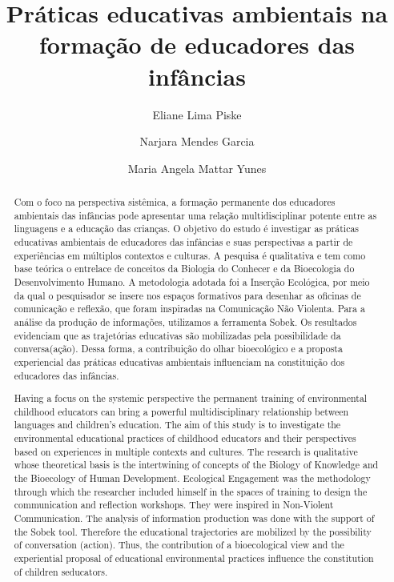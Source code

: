 \documentclass{textolivre}
\title{Práticas educativas ambientais na formação de educadores das infâncias}
\author[1]{Eliane Lima Piske}
\author[2]{Narjara Mendes Garcia}
\author[3]{Maria Angela Mattar Yunes}
\affil[1]{Universidade Federal do Rio Grande, Brasil. Email: \url{e.nanny@hotmail.com} \orcid{0000-0003-0933-4835}}
\affil[2]{Universidade Federal do Rio Grande, Brasil. Email: \url{narjaramg@gmail.com} \orcid{0000-0003-0947-6542}}
\affil[3]{Universidade Salgado de Oliveira, Brasil. Email: \url{mamyunes@gmail.com} \orcid{0000-0002-4653-3895}}
\begin{document}
\maketitle

\begin{poliabstract}
\begin{abstract}
Com o foco na perspectiva sistêmica, a formação permanente dos educadores ambientais das infâncias pode apresentar uma relação multidisciplinar potente entre as linguagens e a educação das crianças. O objetivo do estudo é investigar as práticas educativas ambientais de educadores das infâncias e suas perspectivas a partir de experiências em múltiplos contextos e culturas. A pesquisa é qualitativa e tem como base teórica o entrelace de conceitos da Biologia do Conhecer e da Bioecologia do Desenvolvimento Humano. A metodologia adotada foi a Inserção Ecológica, por meio da qual o pesquisador se insere nos espaços formativos para desenhar as oficinas de comunicação e reflexão, que foram inspiradas na Comunicação Não Violenta. Para a análise da produção de informações, utilizamos a ferramenta Sobek. Os resultados evidenciam que as trajetórias educativas são mobilizadas pela possibilidade da conversa(ação). Dessa forma, a contribuição do olhar bioecológico e a proposta experiencial das práticas educativas ambientais influenciam na constituição dos educadores das infâncias.

\end{abstract}

\begin{english}
\begin{abstract}
Having a focus on the systemic perspective the permanent training of environmental childhood educators can bring a powerful multidisciplinary relationship between languages and children's education. The aim of this study is to investigate the environmental educational practices of childhood educators and their perspectives based on experiences in multiple contexts and cultures. The research is qualitative whose theoretical basis is the intertwining of concepts of the Biology of Knowledge and the Bioecology of Human Development. Ecological Engagement was the methodology through which the researcher included himself in the spaces of training to design the communication and reflection workshops. They were inspired in Non-Violent Communication. The analysis of information production was done with the support of the Sobek tool. Therefore the educational trajectories are mobilized by the possibility of conversation (action). Thus, the contribution of a bioecological view and the experiential proposal of educational environmental practices influence the constitution of children seducators.

\end{abstract}
\end{english}
\end{poliabstract}
\end{document}

